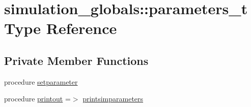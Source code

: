 \hypertarget{structsimulation__globals_1_1parameters__t}{}\section{simulation\+\_\+globals\+:\+:parameters\+\_\+t Type Reference}
\label{structsimulation__globals_1_1parameters__t}
\subsection*{Private Member Functions}
\begin{DoxyCompactItemize}
\item 
procedure \mbox{\hyperlink{structsimulation__globals_1_1parameters__t_ad59ffcdf9208a52e7d3dae903197be74}{setparameter}}
\item 
procedure \mbox{\hyperlink{structsimulation__globals_1_1parameters__t_a6b56d89976f9cef3fef2e8f54fcb1bdf}{printout}} =$>$ \mbox{\hyperlink{namespacesimulation__globals_aab481887940af0d76b2d7aa844382faa}{printsimparameters}}
\end{DoxyCompactItemize}
